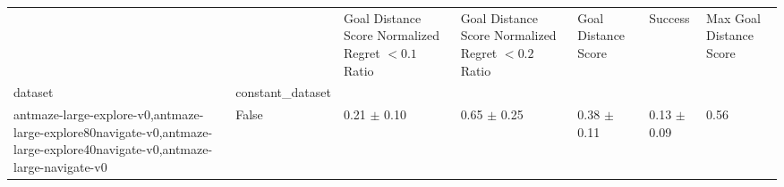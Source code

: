 \begin{tabular}{lllllll}
\toprule
 &  & Goal Distance Score Normalized Regret $< 0.1$ Ratio & Goal Distance Score Normalized Regret $< 0.2$ Ratio & Goal Distance Score & Success & Max Goal Distance Score \\
dataset & constant_dataset &  &  &  &  &  \\
\midrule
antmaze-large-explore-v0,antmaze-large-explore80navigate-v0,antmaze-large-explore40navigate-v0,antmaze-large-navigate-v0 & False & 0.21 $\pm$ 0.10 & 0.65 $\pm$ 0.25 & 0.38 $\pm$ 0.11 & 0.13 $\pm$ 0.09 & 0.56 \\
\cline{1-7}
\bottomrule
\end{tabular}
